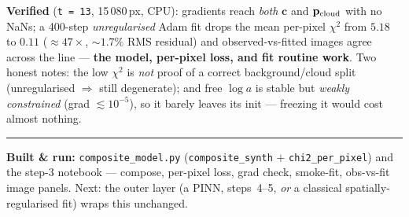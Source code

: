 \documentclass[10pt,a4paper]{article}
\newcommand{\co}[1]{{\small\texttt{#1}}}
\begin{document}
\textbf{Verified} (\co{t\,=\,13}, 15\,080\,px, CPU): gradients reach \emph{both} $\mathbf c$ and $\mathbf p_{\rm cloud}$ with no NaNs; a 400-step \emph{unregularised} Adam fit drops the mean per-pixel $\chi^2$ from $5.18$ to $0.11$ ($\approx\!47\times$, $\sim\!1.7\%$ RMS residual) and observed-vs-fitted images agree across the line --- \textbf{the model, per-pixel loss, and fit routine work}. Two honest notes: the low $\chi^2$ is \emph{not} proof of a correct background/cloud split (unregularised $\Rightarrow$ still degenerate); and free $\log a$ is stable but \emph{weakly constrained} (grad $\lesssim\!10^{-5}$), so it barely leaves its init --- freezing it would cost almost nothing.

\vspace{1pt}
{\footnotesize\color{gry}\rule{\textwidth}{0.4pt}}
{\sffamily\color{gry}\footnotesize \textbf{Built \& run:} \co{composite\_model.py} (\co{composite\_synth} $+$ \co{chi2\_per\_pixel}) and the step-3 notebook --- compose, per-pixel loss, grad check, smoke-fit, obs-vs-fit image panels. Next: the outer layer (a PINN, steps~4--5, \emph{or} a classical spatially-regularised fit) wraps this unchanged.}
\end{document}
